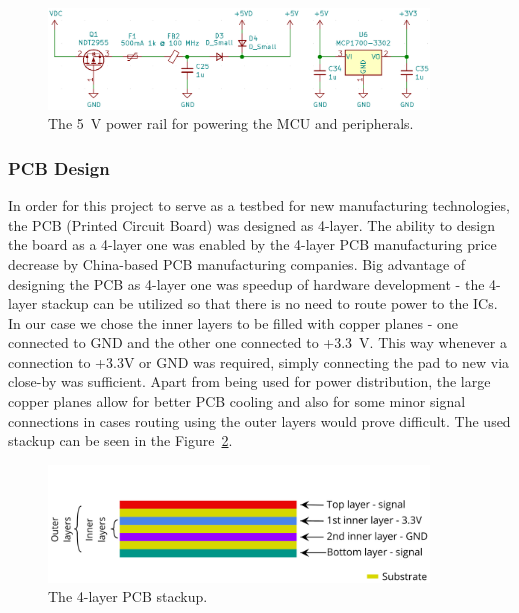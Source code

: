 \begin{figure}[H]
    \centering
    \includegraphics[width=0.9\textwidth]{obrazky/power}
    \caption{The 5~V power rail for powering the MCU and peripherals.}
    \label{fig:power}
\end{figure}

\subsubsection{PCB Design}
\label{subsubsec:pcb_design}
In order for this project to serve as a testbed for new manufacturing technologies, the PCB (Printed Circuit Board) was designed as 4-layer.
The ability to design the board as a 4-layer one was enabled by the 4-layer PCB manufacturing price decrease by China-based PCB manufacturing companies.
Big advantage of designing the PCB as 4-layer one was speedup of hardware development - the 4-layer stackup can be utilized so that there is no need to route power to the ICs.
In our case we chose the inner layers to be filled with copper planes - one connected to GND and the other one connected to +3.3~V.
This way whenever a connection to +3.3V or GND was required, simply connecting the pad to new via close-by was sufficient.
Apart from being used for power distribution, the large copper planes allow for better PCB cooling and also for some minor signal connections in cases routing using the outer layers would prove difficult.
The used stackup can be seen in the Figure~\ref{fig:stackup}.

\begin{figure}[H]
    \centering
    \includegraphics[width=0.9\textwidth]{obrazky/stackup}
    \caption{The 4-layer PCB stackup.}
    \label{fig:stackup}
\end{figure}

